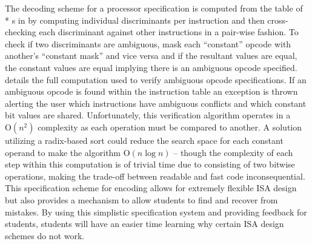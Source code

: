 The decoding scheme for a processor specification is computed from the table of \\* s in  by computing individual discriminants per instruction and then cross-checking each discriminant against other instructions in a pair-wise fashion. To check if two discriminants are ambiguous, mask each ``constant'' opcode with another's ``constant mask'' and vice versa and if the resultant values are equal, the constant values are equal implying there is an ambiguous opcode specified.  details the full computation used to verify ambiguous opcode specifications. If an ambiguous opcode is found within the instruction table an exception is thrown alerting the user which instructions have ambiguous conflicts and which constant bit values are shared. Unfortunately, this verification algorithm operates in a $\text{O}(n^2)$ complexity as each operation must be compared to another. A solution utilizing a radix-based sort could reduce the search space for each constant operand to make the algorithm $\text{O}(n \log n)$ \cite{Goodrich2014} -- though the complexity of each step within this computation is of trivial time due to consisting of two bitwise operations, making the trade-off between readable and fast code inconsequential. This specification scheme for encoding allows for extremely flexible ISA design but also provides a mechanism to allow students to find and recover from mistakes. By using this simplistic specification system and providing feedback for students, students will have an easier time learning why certain ISA design schemes do not work. 


